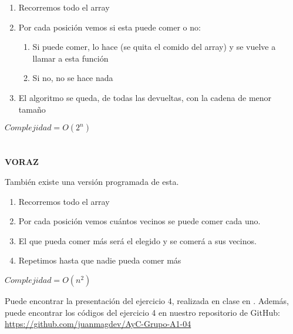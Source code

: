 \documentclass[11pt, a4paper]{exam}
\begin{document}
\begin{questions}
\begin{solution}
            \begin{enumerate}
                \item Recorremos todo el array
                \item Por cada posición vemos si esta puede comer o no:
                   \begin{enumerate}
                      \item Si puede comer, lo hace (se quita el comido del array) y se vuelve a llamar a esta función
                      \item Si no, no se hace nada
                   \end{enumerate}
                \item El algoritmo se queda, de todas las devueltas, con la cadena de menor tamaño
            \end{enumerate}
            $Complejidad = O(2^n)$
            \\
            \\
            \\
            \textbf{VORAZ} 



            También existe una versión programada de esta.
                    \begin{enumerate}
                \item Recorremos todo el array
                \item Por cada posición vemos cuántos vecinos se puede comer cada uno.
                \item El que pueda comer más será el elegido y se comerá a sus vecinos.
                \item Repetimos hasta que nadie pueda comer más
            \end{enumerate}
            $Complejidad = O(n^2)$
            
    \end{solution}
    
    Puede encontrar la presentación del ejercicio 4, realizada en clase en             \href{https://docs.google.com/presentation/d/1r6FI3wsCIXxYozxNeoR2K6Ct4r2eQmplCFJDrkbXZK4/edit?usp=sharing}{\color{blue}{este enlace}}. 
    Además, puede encontrar los códigos del ejercicio 4 en nuestro repositorio de GitHub: \url{https://github.com/juanmagdev/AyC-Grupo-A1-04}

\end{questions}



\end{document}
